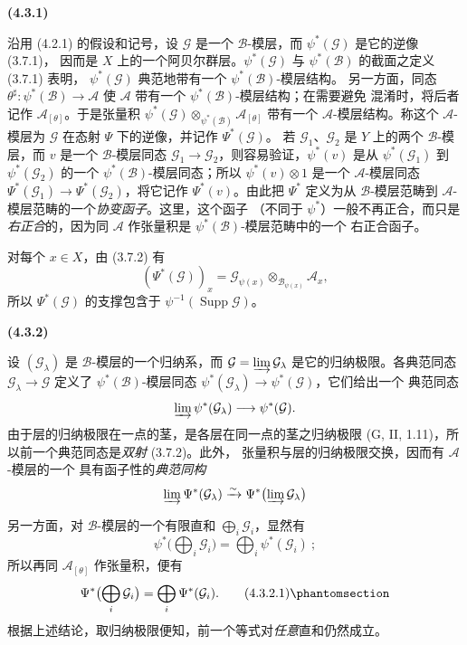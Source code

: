 \documentclass[UTF8,fontset=none,11pt,oneside,openany]{ctexbook}
\newenvironment{env}[1][]{%
  \par\medskip\noindent\textbf{(#1)}\ %
}{\par}
\let\EGAOriginalLabel\label
\renewcommand{\label}[1]{\phantomsection\EGAOriginalLabel{#1}}
\begin{document}
\begin{env}[4.3.1]
\label{0.4.3.1-fr}
沿用 (4.2.1) 的假设和记号，设 $\mathcal{G}$ 是一个
$\mathcal{B}$-模层，而 $\psi^*(\mathcal{G})$ 是它的逆像 (3.7.1)，
因而是 $X$ 上的一个阿贝尔群层。$\psi^*(\mathcal{G})$ 与
$\psi^*(\mathcal{B})$ 的截面之定义 (3.7.1) 表明，
$\psi^*(\mathcal{G})$ 典范地带有一个 $\psi^*(\mathcal{B})$-模层结构。
另一方面，同态 $\theta^\sharp:\psi^*(\mathcal{B})\to\mathcal{A}$
使 $\mathcal{A}$ 带有一个 $\psi^*(\mathcal{B})$-模层结构；在需要避免
混淆时，将后者记作 $\mathcal{A}_{[\theta]}$。于是张量积
$\psi^*(\mathcal{G})\otimes_{\psi^*(\mathcal{B})}\mathcal{A}_{[\theta]}$
带有一个 $\mathcal{A}$-模层结构。称这个 $\mathcal{A}$-模层为
$\mathcal{G}$ 在态射 $\Psi$ 下的逆像，并记作 $\Psi^*(\mathcal{G})$。
若 $\mathcal{G}_1$、$\mathcal{G}_2$ 是 $Y$ 上的两个
$\mathcal{B}$-模层，而 $v$ 是一个 $\mathcal{B}$-模层同态
$\mathcal{G}_1\to\mathcal{G}_2$，则容易验证，$\psi^*(v)$ 是从
$\psi^*(\mathcal{G}_1)$ 到 $\psi^*(\mathcal{G}_2)$ 的一个
$\psi^*(\mathcal{B})$-模层同态；所以 $\psi^*(v)\otimes1$ 是一个
$\mathcal{A}$-模层同态
$\Psi^*(\mathcal{G}_1)\to\Psi^*(\mathcal{G}_2)$，将它记作
$\Psi^*(v)$。由此把 $\Psi^*$ 定义为从 $\mathcal{B}$-模层范畴到
$\mathcal{A}$-模层范畴的一个\emph{协变函子}。这里，这个函子
（不同于 $\psi^*$）一般不再正合，而只是\emph{右正合}的，因为同
$\mathcal{A}$ 作张量积是 $\psi^*(\mathcal{B})$-模层范畴中的一个
右正合函子。

对每个 $x\in X$，由 (3.7.2) 有
\[
  (\Psi^*(\mathcal{G}))_x
  =\mathcal{G}_{\psi(x)}\otimes_{\mathcal{B}_{\psi(x)}}\mathcal{A}_x,
\]
所以 $\Psi^*(\mathcal{G})$ 的支撑包含于
$\psi^{-1}(\operatorname{Supp}\mathcal{G})$。
\end{env}

\begin{env}[4.3.2]
\label{0.4.3.2-fr}
设 $(\mathcal{G}_\lambda)$ 是 $\mathcal{B}$-模层的一个归纳系，而
$\mathcal{G}=\varinjlim\mathcal{G}_\lambda$ 是它的归纳极限。各典范同态
$\mathcal{G}_\lambda\to\mathcal{G}$ 定义了
$\psi^*(\mathcal{B})$-模层同态
$\psi^*(\mathcal{G}_\lambda)\to\psi^*(\mathcal{G})$，它们给出一个
典范同态
\[
  \varinjlim\psi^*(\mathcal{G}_\lambda)
  \longrightarrow
  \psi^*(\mathcal{G}).
\]
由于层的归纳极限在一点的茎，是各层在同一点的茎之归纳极限
(G, II, 1.11)，所以前一个典范同态是\emph{双射} (3.7.2)。此外，
张量积与层的归纳极限交换，因而有 $\mathcal{A}$-模层的一个
具有函子性的\emph{典范同构}
\[
  \varinjlim\Psi^*(\mathcal{G}_\lambda)
  \xrightarrow{\sim}
  \Psi^*\bigl(\varinjlim\mathcal{G}_\lambda\bigr)
\]

另一方面，对 $\mathcal{B}$-模层的一个有限直和
$\bigoplus_i\mathcal{G}_i$，显然有
\[
  \psi^*\bigl(\bigoplus_i\mathcal{G}_i\bigr)
  =\bigoplus_i\psi^*(\mathcal{G}_i)~;
\]
所以再同 $\mathcal{A}_{[\theta]}$ 作张量积，便有
\[
  \Psi^*\bigl(\bigoplus_i\mathcal{G}_i\bigr)
  =\bigoplus_i\Psi^*(\mathcal{G}_i).
  \tag{4.3.2.1}\label{0.4.3.2.1-fr}
\]
根据上述结论，取归纳极限便知，前一个等式对\emph{任意}直和仍然成立。
\end{env}
\end{document}
